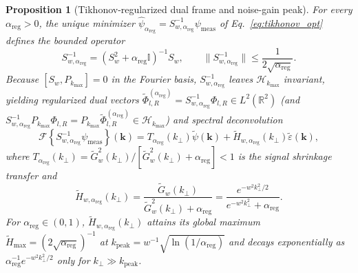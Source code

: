 \documentclass[aps,pra,onecolumn,notitlepage,11pt,tightenlines,nofootinbib,floatfix,longbibliography]{revtex4-2}
\newtheorem{proposition}{Proposition}
\theoremstyle{remark}
\newcommand{\norm}[1]{\lVert #1 \rVert}
\begin{document}
\begin{proposition}[Tikhonov-regularized dual frame and noise-gain peak]
\label{prop:tikhonov_dual}
For every $\alpha_{\mathrm{reg}} > 0$, the unique minimizer $\hat{\psi}_{\alpha_{\mathrm{reg}}} = S_{w,\alpha_{\mathrm{reg}}}^{-1}\psi_{\mathrm{meas}}$ of Eq.~\eqref{eq:tikhonov_opt} defines the bounded operator
\begin{equation}
S_{w,\alpha_{\mathrm{reg}}}^{-1} = \left(S_w^2 + \alpha_{\mathrm{reg}}\mathbb{I}\right)^{-1} S_w, \qquad \norm{S_{w,\alpha_{\mathrm{reg}}}^{-1}} \le \frac{1}{2\sqrt{\alpha_{\mathrm{reg}}}}.
\label{eq:tikhonov_op_def}
\end{equation}
Because $[S_w, P_{k_{\max}}] = 0$ in the Fourier basis, $S_{w,\alpha_{\mathrm{reg}}}^{-1}$ leaves $\mathcal{H}_{k_{\max}}$ invariant, yielding regularized dual vectors $\widetilde{\Phi}_{l,R}^{(\alpha_{\mathrm{reg}})} = S_{w,\alpha_{\mathrm{reg}}}^{-1}\Phi_{l,R} \in L^2(\mathbb{R}^2)$ (and $S_{w,\alpha_{\mathrm{reg}}}^{-1}P_{k_{\max}}\Phi_{l,R} = P_{k_{\max}}\widetilde{\Phi}_{l,R}^{(\alpha_{\mathrm{reg}})} \in \mathcal{H}_{k_{\max}}$) and spectral deconvolution
\begin{equation}
\mathcal{F}\!\left\{S_{w,\alpha_{\mathrm{reg}}}^{-1}\psi_{\mathrm{meas}}\right\}(\mathbf{k}) = T_{\alpha_{\mathrm{reg}}}(k_\perp)\widetilde{\psi}(\mathbf{k}) + \widetilde{H}_{w,\alpha_{\mathrm{reg}}}(k_\perp)\widetilde{\varepsilon}(\mathbf{k}),
\label{eq:synth_multiplier}
\end{equation}
where $T_{\alpha_{\mathrm{reg}}}(k_\perp) = \widetilde{G}_w^2(k_\perp)/[\widetilde{G}_w^2(k_\perp) + \alpha_{\mathrm{reg}}] < 1$ is the signal shrinkage transfer and
\begin{equation}
\widetilde{H}_{w,\alpha_{\mathrm{reg}}}(k_\perp) = \frac{\widetilde{G}_w(k_\perp)}{\widetilde{G}_w^2(k_\perp) + \alpha_{\mathrm{reg}}} = \frac{e^{-w^2 k_\perp^2/2}}{e^{-w^2 k_\perp^2} + \alpha_{\mathrm{reg}}}.
\label{eq:noise_multiplier}
\end{equation}
For $\alpha_{\mathrm{reg}} \in (0,1)$, $\widetilde{H}_{w,\alpha_{\mathrm{reg}}}(k_\perp)$ attains its global maximum $\widetilde{H}_{\max} = (2\sqrt{\alpha_{\mathrm{reg}}})^{-1}$ at $k_{\mathrm{peak}} = w^{-1}\sqrt{\ln(1/\alpha_{\mathrm{reg}})}$ and decays exponentially as $\alpha_{\mathrm{reg}}^{-1} e^{-w^2 k_\perp^2/2}$ only for $k_\perp \gg k_{\mathrm{peak}}$.
\end{proposition}
\end{document}
